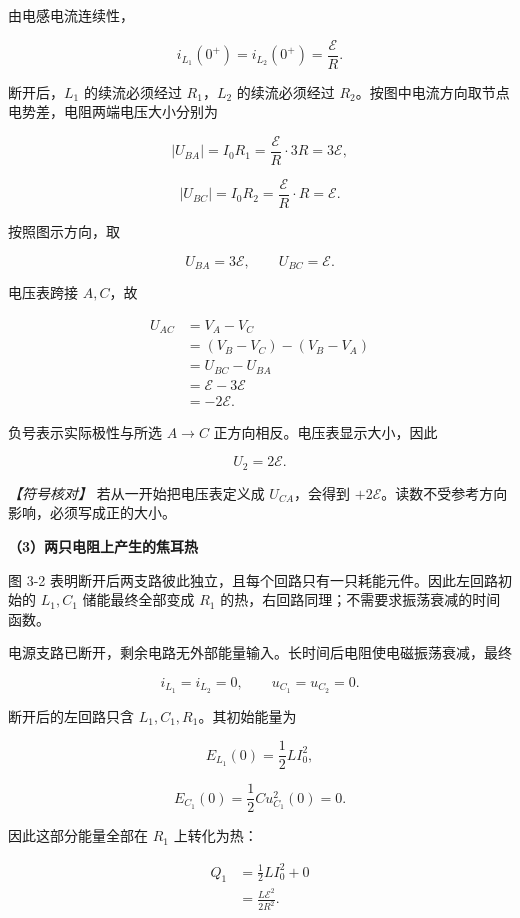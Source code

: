 \documentclass[12pt,a4paper,UTF8]{ctexart}
\begin{document}
由电感电流连续性，

\[i_{L_1}(0^+)=i_{L_2}(0^+)=\frac{\mathcal E}{R}. \tag{30}\]

断开后，\(L_1\) 的续流必须经过 \(R_1\)，\(L_2\) 的续流必须经过
\(R_2\)。按图中电流方向取节点电势差，电阻两端电压大小分别为

\[|U_{BA}|=I_0R_1
=\frac{\mathcal E}{R}\cdot3R
=3\mathcal E, \tag{31}\]

\[|U_{BC}|=I_0R_2
=\frac{\mathcal E}{R}\cdot R
=\mathcal E. \tag{32}\]

按照图示方向，取

\[U_{BA}=3\mathcal E,\qquad U_{BC}=\mathcal E.\]

电压表跨接 \(A,C\)，故

\[\begin{aligned}
U_{AC}
&=V_A-V_C\\
&=(V_B-V_C)-(V_B-V_A)\\
&=U_{BC}-U_{BA}\\
&=\mathcal E-3\mathcal E\\
&=-2\mathcal E.
\end{aligned}\]

负号表示实际极性与所选 \(A\to C\) 正方向相反。电压表显示大小，因此

\[\boxed{U_2=2\mathcal E}. \tag{33}\]

\emph{【符号核对】} 若从一开始把电压表定义成 \(U_{CA}\)，会得到
\(+2\mathcal E\)。读数不受参考方向影响，必须写成正的大小。

\textbf{（3）两只电阻上产生的焦耳热}

图 3-2
表明断开后两支路彼此独立，且每个回路只有一只耗能元件。因此左回路初始的
\(L_1,C_1\) 储能最终全部变成 \(R_1\)
的热，右回路同理；不需要求振荡衰减的时间函数。

电源支路已断开，剩余电路无外部能量输入。长时间后电阻使电磁振荡衰减，最终

\[i_{L_1}=i_{L_2}=0,\qquad u_{C_1}=u_{C_2}=0.\]

断开后的左回路只含 \(L_1,C_1,R_1\)。其初始能量为

\[E_{L_1}(0)=\frac12LI_0^2,\]

\[E_{C_1}(0)=\frac12Cu_{C_1}^2(0)=0.\]

因此这部分能量全部在 \(R_1\) 上转化为热：

\[\begin{aligned}
Q_1
&=\frac12LI_0^2+0\\
&=\boxed{\frac{L\mathcal E^2}{2R^2}}.
\end{aligned} \tag{34}\]
\end{document}
